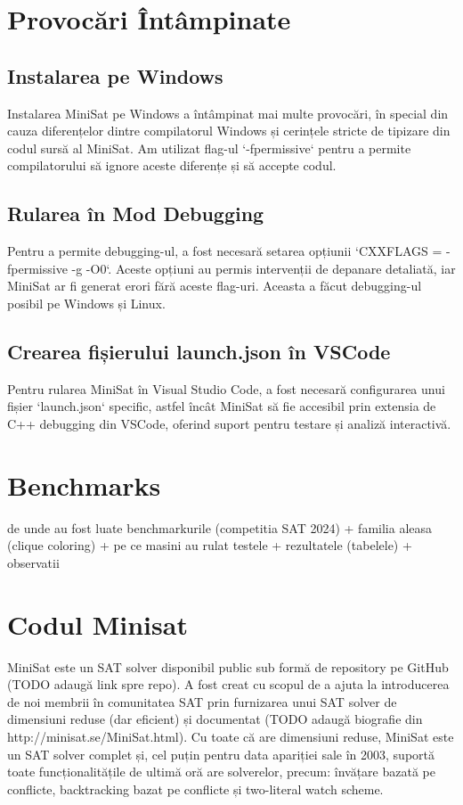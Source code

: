\documentclass{llncs}
\begin{document}
\section{Provocări Întâmpinate}

\subsection{Instalarea pe Windows}

Instalarea MiniSat pe Windows a întâmpinat mai multe provocări, în special din cauza diferențelor dintre compilatorul Windows și cerințele stricte de tipizare din codul sursă al MiniSat. Am utilizat flag-ul `-fpermissive` pentru a permite compilatorului să ignore aceste diferențe și să accepte codul.

\subsection{Rularea în Mod Debugging}

Pentru a permite debugging-ul, a fost necesară setarea opțiunii `CXXFLAGS = -fpermissive -g -O0`. Aceste opțiuni au permis intervenții de depanare detaliată, iar MiniSat ar fi generat erori fără aceste flag-uri. Aceasta a făcut debugging-ul posibil pe Windows și Linux.

\subsection{Crearea fișierului launch.json în VSCode}

Pentru rularea MiniSat în Visual Studio Code, a fost necesară configurarea unui fișier `launch.json` specific, astfel încât MiniSat să fie accesibil prin extensia de C++ debugging din VSCode, oferind suport pentru testare și analiză interactivă.

\section{Benchmarks}
de unde au fost luate benchmarkurile (competitia SAT 2024) + familia aleasa (clique coloring) + pe ce masini au rulat testele + rezultatele (tabelele) + observatii

\section{Codul Minisat}
MiniSat este un SAT solver disponibil public sub formă de repository pe GitHub (TODO adaugă link spre repo). A fost creat cu scopul de a ajuta la introducerea de noi membrii în comunitatea SAT prin furnizarea unui SAT solver de dimensiuni reduse (dar eficient) și documentat (TODO adaugă biografie din http://minisat.se/MiniSat.html). Cu toate că are dimensiuni reduse, MiniSat este un SAT solver complet și, cel puțin pentru data apariției sale în 2003, suportă toate funcționalitățile de ultimă oră are solverelor, precum: învățare bazată pe conflicte, backtracking bazat pe conflicte și two-literal watch scheme.
\end{document}
